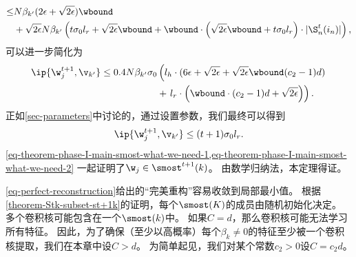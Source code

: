 \begin{myproof}
\begin{equation}
\begin{aligned}
        \leq &
        N \beta_{k^{\prime}} 
        (2\epsilon + \sqrt{2\epsilon}) \wbound \\
        & + \sqrt{2\epsilon} N \beta_{k^{\prime}} \left( t \sigma_0 l_r + \sqrt{2\epsilon} \wbound
        + \wbound \cdot \left( 
        \sqrt{2\epsilon}\wbound + t\sigma_0 l_r \right) \cdot
        |\S_n^t(i_n)| \right),
    \end{aligned}
\end{equation}
可以进一步简化为
\begin{equation}\label{eq-theorem-phase-I-main-smost-what-we-need-2}
\begin{aligned}
    \ip{ \w_{j}^{t+1} ,  \v_{k^{\prime}} } 
    \leq 0.4 N \beta_{k^{\prime}} \sigma_0 
    & \left( l_h \cdot (6 \epsilon + \sqrt{2\epsilon} + \sqrt{2\epsilon} \wbound (c_2 - 1)d ) \right. \\
    & + \left. l_r \cdot \left(\wbound \cdot (c_2 - 1) d + \sqrt{2\epsilon}\right)\right).
\end{aligned}
\end{equation}
正如\cref{sec-parameters}中讨论的，通过设置参数，我们最终可以得到
\begin{equation}
    \ip{ \w_{j}^{t+1} ,  \v_{k^{\prime}} } \leq (t+1)\sigma_0 l_r.
\end{equation}
\cref{eq-theorem-phase-I-main-smost-what-we-need-1,eq-theorem-phase-I-main-smost-what-we-need-2} 一起证明了$\w_j \in \smost^{t+1}(k)$。
由数学归纳法，本定理得证。
\end{myproof}

\begin{remark}[过参数化模型是必要的]\label{remark-overpara-is-necessary}
    \cref{eq-perfect-reconstruction}给出的“完美重构”容易收敛到局部最小值。
    根据\cref{theorem-Stk-subset-st+1k}的证明，每个$\smost(K)$的成员由随机初始化决定。
    多个卷积核可能包含在一个$\smost(k)$中。
    如果$C=d$，那么卷积核可能无法学习所有特征。
    因此，为了确保（至少以高概率）每个$\beta_k \neq 0$的特征至少被一个卷积核提取，我们在本章中设$C > d$。
    为简单起见，我们对某个常数$c_2 > 0$设$C = c_2 d$。
\end{remark}


